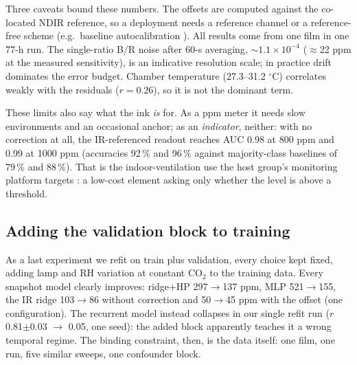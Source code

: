 \documentclass[twocolumn]{revtex4}
\begin{document}
Three caveats bound these numbers. The offsets are computed against the
co-located NDIR reference, so a deployment needs a reference channel or a
reference-free scheme (e.g.\ baseline autocalibration \cite{vergara}).
All results come from one film in one 77-h run. The single-ratio B/R noise after 60-s averaging,
$\sim$$1.1\times10^{-4}$ ($\approx$22 ppm at the measured sensitivity),
is an indicative resolution scale; in practice drift dominates the
error budget. Chamber temperature (27.3--31.2 $^\circ$C) correlates
weakly with the residuals ($r=0.26$), so it is not the dominant term.

These limits also say what the ink \emph{is} for. As a ppm meter it
needs slow environments and an occasional anchor; as an \emph{indicator},
neither: with no correction at all, the IR-referenced readout reaches
AUC 0.98 at 800 ppm and 0.99 at 1000 ppm (accuracies 92\,\% and 96\,\%
against majority-class baselines of 79\,\% and 88\,\%). That is the
indoor-ventilation use the host group's monitoring platform targets
\cite{gonzalez25,benito25}: a low-cost element asking only whether the
level is above a threshold.

\subsection{Adding the validation block to training}

As a last experiment we refit on train plus validation, every choice
kept fixed, adding lamp and RH variation at constant CO$_2$ to the
training data. Every snapshot model clearly improves:
ridge+HP 297$\to$137 ppm, MLP 521$\to$155, the IR ridge 103$\to$86
without correction and 50$\to$45 ppm with the offset (one
configuration). The recurrent model instead collapses in our single
refit run ($r$ 0.81$\pm$0.03 $\to$ 0.05, one seed): the added block
apparently teaches it a wrong temporal regime. The binding constraint,
then, is the data itself: one film, one run, five similar sweeps, one
confounder block.

\newpage
\end{document}
